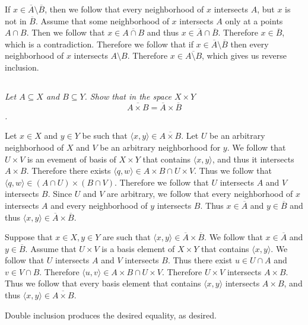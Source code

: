 \documentclass[11pt,oneside,titlepage]{book}
\newcommand{\eangle}[1]{\langle #1 \rangle}
\begin{document}
If $x \in \overline{A} \setminus \overline{B}$, then we follow that
every neighborhood of $x$ intersects $A$, but $x$ is not in $\overline{B}$.
Assume that some neighborhood of $x$ intersects $A$ only at a points $A \cap B$.
Then we follow that $x \in \overline{A \cap B}$ and thus $x \in \overline{A} \cap
\overline{B}$. Therefore $x \in \overline{B}$, which is a contradiction.
Therefore we follow that if $x \in \overline{A} \setminus \overline{B}$
then every neighborhood of $x$ intersects $A \setminus B$. Therefore
$x \in \overline{A \setminus B}$, which gives us reverse inclusion.

\subsection{}

\textit{Let $A \subseteq X$ and $B \subseteq Y$. Show that in the space $X \times Y$
  $$\overline{A \times B} = \overline{A} \times \overline{B}$$.}

Let $x \in X$ and $y \in Y$ be such that  $\eangle{x, y} \in \overline{A \times B}$.
Let $U$ be an arbitrary neighborhood of $X$ and $V$ be an arbitrary neighborhood for $y$.
We follow that $U \times V$ is an evement of basis of $X \times Y$ that contains
$\eangle{x, y}$, and thus it intersects $A \times B$.
Therefore there exists $\eangle{q, w} \in A \times B \cap U \times V$.
Thus we follow that $\eangle{q, w} \in (A \cap U) \times (B \cap V)$.
Therefore we follow that $U$ intersects $A$ and $V$ intersects $B$.
Since $U$ and $V$ are arbitrary, we follow that every neighborhood of $x$ intersects
$A$ and every neighborhood of $y$ intersects $B$. Thus $x \in \overline{A}$ and
$y \in \overline{B}$ and thus $\eangle{x, y} \in \overline{A} \times \overline{B}$.

Suppose that $x \in X, y \in Y$ are such that $\eangle{x, y} \in \overline{A} \times \overline{B}$.
We follow that $x \in \overline{A}$ and $y \in \overline{B}$. Assume that $U \times V$ is a
basis element of $X \times Y$ that contains $\eangle{x, y}$.
We follow that $U$ intersects $A$ and $V$ intersects $B$. Thus there exist
$u \in U \cap A$ and $v \in V \cap B$. Therefore $\eangle{u, v} \in A \times B \cap U \times V$.
Therefore $U \times V$ intersects $A \times B$. Thus we follow that every
basis element that contains $\eangle{x, y}$ intersects $A \times B$, and thus
$\eangle{x, y} \in \overline{A \times B}$.

Double inclusion produces the desired equality, as desired.
\end{document}
